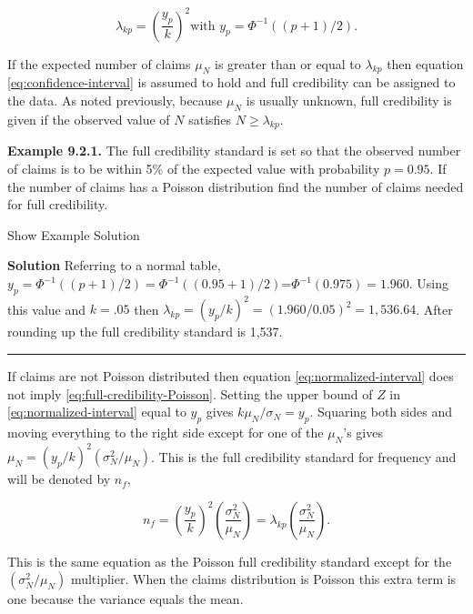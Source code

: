 \documentclass[]{book}
\theoremstyle{definition}
\theoremstyle{definition}
\theoremstyle{definition}
\theoremstyle{remark}
\begin{document}
\begin{equation}
\lambda_{kp} = \left(\frac{y_p}{k}\right)^2 \textrm{with } y_p=\Phi^{-1}((p+1)/2).
\label{eq:full-credibility-Poisson}
\end{equation}

If the expected number of claims \(\mu_N\) is greater than or equal to
\(\lambda_{kp}\) then equation \eqref{eq:confidence-interval} is assumed
to hold and full credibility can be assigned to the data. As noted
previously, because \(\mu_N\) is usually unknown, full credibility is
given if the observed value of \(N\) satisfies \(N \geq \lambda_{kp}.\)

\textbf{Example 9.2.1.} The full credibility standard is set so that the
observed number of claims is to be within 5\% of the expected value with
probability \(p=0.95\). If the number of claims has a Poisson
distribution find the number of claims needed for full credibility.

Show Example Solution

\hypertarget{toggleExampleCred.2.1}{}
\textbf{Solution} Referring to a normal table,
\(y_p=\Phi^{-1}((p+1)/2)=\Phi^{-1}((0.95+1)/2)\)=\(\Phi^{-1}(0.975)=1.960\).
Using this value and \(k=.05\) then
\(\lambda_{kp} = (y_p/k)^{2}=(1.960/0.05)^{2}=1,536.64\). After rounding
up the full credibility standard is 1,537.

\begin{center}\rule{0.5\linewidth}{\linethickness}\end{center}

If claims are not Poisson distributed then equation
\eqref{eq:normalized-interval} does not imply
\eqref{eq:full-credibility-Poisson}. Setting the upper bound of \(Z\) in
\eqref{eq:normalized-interval} equal to \(y_p\) gives
\(k\mu_N/\sigma_N=y_p\). Squaring both sides and moving everything to
the right side except for one of the \(\mu_N\)'s gives
\(\mu_N=(y_p/k)^2(\sigma_N^2/\mu_N)\). This is the full credibility
standard for frequency and will be denoted by \(n_f\),

\begin{equation}
n_f=\left(\frac{y_p}{k}\right)^2\left(\frac{\sigma_N^2}{\mu_N}\right)=\lambda_{kp}\left(\frac{\sigma_N^2}{\mu_N}\right).
\label{eq:full-credibility-frequency}
\end{equation}

This is the same equation as the Poisson full credibility standard
except for the \((\sigma_N^2/\mu_N)\) multiplier. When the claims
distribution is Poisson this extra term is one because the variance
equals the mean.
\end{document}
